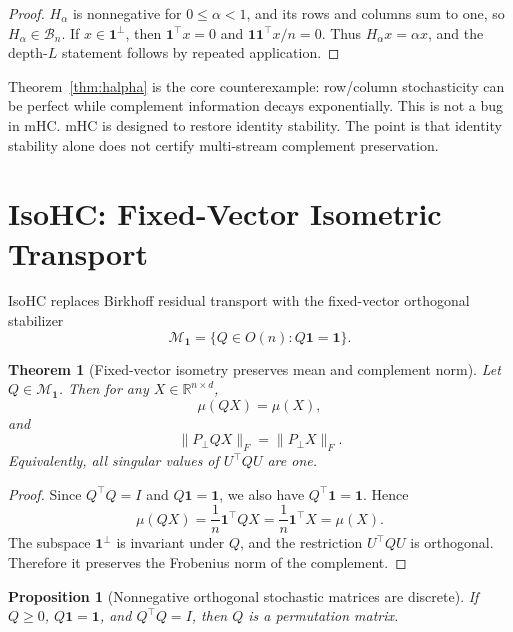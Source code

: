 \documentclass[10pt]{article}
\newtheorem{theorem}{Theorem}
\newtheorem{proposition}{Proposition}
\newcommand{\one}{\mathbf{1}}
\newcommand{\R}{\mathbb{R}}
\newcommand{\Birk}{\mathcal{B}_n}
\newcommand{\Mone}{\mathcal{M}_{\one}}
\newcommand{\pperp}{P_{\perp}}
\newcommand{\operp}{\one^{\perp}}
\begin{document}
\begin{proof}
$H_\alpha$ is nonnegative for $0\le\alpha<1$, and its rows and columns sum to
one, so $H_\alpha\in\Birk$.  If $x\in\operp$, then $\one^\top x=0$ and
$\one\one^\top x/n=0$.  Thus $H_\alpha x=\alpha x$, and the depth-$L$ statement
follows by repeated application.
\end{proof}

Theorem~\ref{thm:halpha} is the core counterexample: row/column stochasticity can
be perfect while complement information decays exponentially.  This is not a
bug in mHC.  mHC is designed to restore identity stability.  The point is that
identity stability alone does not certify multi-stream complement preservation.

\section{IsoHC: Fixed-Vector Isometric Transport}

IsoHC replaces Birkhoff residual transport with the fixed-vector orthogonal
stabilizer
\begin{equation}
    \Mone=\{Q\in O(n):Q\one=\one\}.
\end{equation}

\begin{theorem}[Fixed-vector isometry preserves mean and complement norm]
\label{thm:isohc}
Let $Q\in\Mone$.  Then for any $X\in\R^{n\times d}$,
\begin{equation}
    \mu(QX)=\mu(X),
\end{equation}
and
\begin{equation}
    \|\pperp QX\|_F=\|\pperp X\|_F.
\end{equation}
Equivalently, all singular values of $U^\top Q U$ are one.
\end{theorem}

\begin{proof}
Since $Q^\top Q=I$ and $Q\one=\one$, we also have $Q^\top\one=\one$.  Hence
\begin{equation}
    \mu(QX)=\frac{1}{n}\one^\top QX=\frac{1}{n}\one^\top X=\mu(X).
\end{equation}
The subspace $\operp$ is invariant under $Q$, and the restriction
$U^\top Q U$ is orthogonal.  Therefore it preserves the Frobenius norm of the
complement.
\end{proof}

\begin{proposition}[Nonnegative orthogonal stochastic matrices are discrete]
\label{prop:permutation}
If $Q\ge 0$, $Q\one=\one$, and $Q^\top Q=I$, then $Q$ is a permutation matrix.
\end{proposition}
\end{document}
